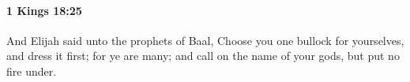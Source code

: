 
		\paragraph{1 Kings 18:25} %
			\label{1KINGS-18-25}

			And Elijah said unto the prophets of Baal, Choose you one bullock for yourselves, and dress it first; for ye are many; and call on the name of your gods, but put no fire under.


